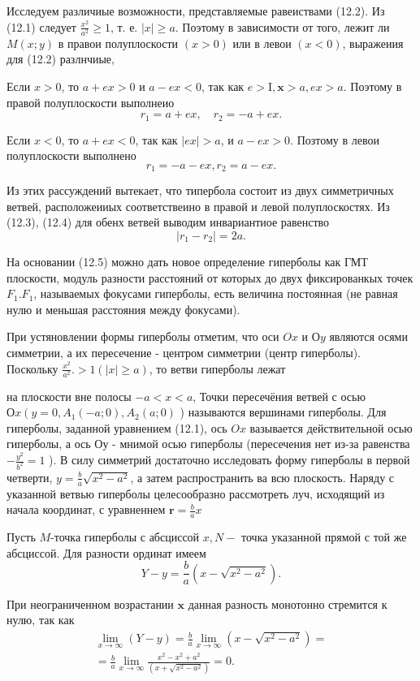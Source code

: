 \documentclass[10pt]{article}
\begin{document}
Исследуем различиые возможности, представляемые равеиствами (12.2). Из (12.1) следует $\frac{x^2}{a^2} \geqslant 1$, т. е. $|x| \geqslant a$. Поэтому в зависимости от того, лежит ли $M(x ; y)$ в правои полуплоскости $(x>0)$ или в левои $(x<0)$, выражеиия для (12.2) разлнчиые,

Если $x>0$, то $a+e x>0$ и $a-e x<0$, так как $e>\mathrm{I}, \boldsymbol{x}>a, e x>a$. Поэтому в правой полуплоскости выполнеио
\[
r_1=a+e x, \quad r_2=-a+e x .\tag{12.3}\label{myeq}
\]

Если $x<0$, то $a+e x<0$, так как $|e x|>a$, и $a-e x>0$. Позтому в левои полуплоскости выполнено
\[
r_1 = -a-e x, r_2=a-e x .\tag{12.4}\label{myeq}
\]

Из этих рассуждений вытекает, что типербола состоит из двух симметричных ветвей, расположеииых соответствеино в правой и левой полуплоскостях. Из (12.3), (12.4) для обенх ветвей выводим инвариантиое равенство
\[
\left|r_1-r_2\right|=2 a . \tag{12.5}\label{myeq}
\]

На основании (12.5) можно дать новое определение гиперболы как ГМТ плоскости, модуль разности расстояний от которых до двух фиксированкых точек $F_1 . F_1$, называемых фокусами гиперболы, есть величина постоянная (не равная нулю и меньшая расстояния между фокусами).

При устяновлении формы гиперболы отметим, что оси $O x$ и $О y$ являются осями симметрии, а их пересечение - центром симметрии (центр гиперболы). Поскольку $\frac{x^2}{a^2}.>1(|x| \geqslant a)$, то ветви гиперболы лежат

\newpage

на плоскости вне полосы $-a<x<a$, Точки пересечёния ветвей с осью $О x\left(y=0, A_1(-a ; 0), A_2(a ; 0)\right.$ ) называются вершинами гиперболы. Для гиперболы, заданной уравнением (12.1), ось $O x$ вазывается действительной осью гиперболы, а ось $О у$ - мнимой осью гиперболы (пересечения нет из-за равенства $-\frac{y^2}{b^2}=1$ ). В силу симметрий достаточно исследовать форму гиперболы в первой четверти, $y=\frac{b}{a} \sqrt{x^2-a^2}$, а затем распространить ва всю плоскость. Наряду с указанной ветвью гиперболы целесообразно рассмотреть луч, исходящий из начала координат, с уравненнем $\boldsymbol{r}=\frac{b}{a} x$

Пусть $M$-точка гиперболы с абсциссой $x, N-$ точка указанной прямой с той же абсциссой. Для разности ординат имеем
$$
Y-y=\frac{b}{a}\left(x-\sqrt{x^2-a^2}\right) .
$$

При неограниченном возрастании $\boldsymbol{x}$ данная разность монотонно стремится к нулю, так как
$$
\begin{gathered}
\lim _{x \rightarrow \infty}(Y-y)=\frac{b}{a} \lim _{x \rightarrow \infty}\left(x-\sqrt{x^2-a^2}\right)= \\
=\frac{b}{a} \lim _{x \rightarrow \infty} \frac{x^2-x^2+a^2}{\left(x+\sqrt{x^2-a^2}\right)}=0 .
\end{gathered}
$$
\end{document}
